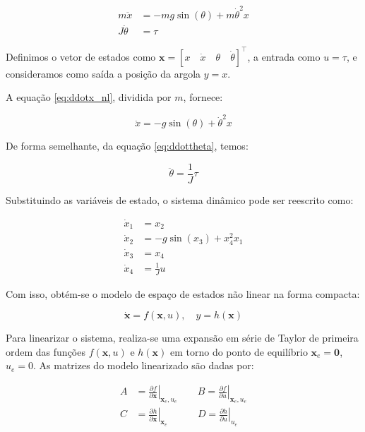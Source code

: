 \documentclass[a4paper, 12pt]{article} %
\begin{document}
\begin{align}
    m \ddot{x} &= -mg \sin(\theta) + m \dot{\theta}^2 x \label{eq:ddotx_nl} \\
    J \ddot{\theta} &= \tau \label{eq:ddottheta}
\end{align}

Definimos o vetor de estados como \( \mathbf{x} = [x \quad \dot{x} \quad \theta \quad \dot{\theta}]^\top \), a entrada como \( u = \tau \), e consideramos como saída a posição da argola \( y = x \).

A equação \eqref{eq:ddotx_nl}, dividida por \( m \), fornece:

\begin{equation}
    \ddot{x} = -g \sin(\theta) + \dot{\theta}^2 x
\end{equation}

De forma semelhante, da equação \eqref{eq:ddottheta}, temos:

\begin{equation}
    \ddot{\theta} = \frac{1}{J} \tau
\end{equation}

Substituindo as variáveis de estado, o sistema dinâmico pode ser reescrito como:

\begin{align}
    \dot{x}_1 &= x_2 \\
    \dot{x}_2 &= -g \sin(x_3) + x_4^2 x_1 \\
    \dot{x}_3 &= x_4 \\
    \dot{x}_4 &= \frac{1}{J} u
\end{align}

Com isso, obtém-se o modelo de espaço de estados não linear na forma compacta:

\begin{equation}
    \dot{\mathbf{x}} = f(\mathbf{x}, u), \quad y = h(\mathbf{x})
\end{equation}

Para linearizar o sistema, realiza-se uma expansão em série de Taylor de primeira ordem das funções \( f(\mathbf{x}, u) \) e \( h(\mathbf{x}) \) em torno do ponto de equilíbrio \( \mathbf{x}_e = \mathbf{0} \), \( u_e = 0 \). As matrizes do modelo linearizado são dadas por:

\begin{align}
    A &= \left.\frac{\partial f}{\partial \mathbf{x}}\right|_{\mathbf{x}_e, u_e} \qquad 
    B = \left.\frac{\partial f}{\partial u}\right|_{\mathbf{x}_e, u_e} \\
    C &= \left.\frac{\partial h}{\partial \mathbf{x}}\right|_{\mathbf{x}_e} \qquad\quad
    D = \left.\frac{\partial h}{\partial u}\right|_{u_e}
\end{align}
\end{document}
